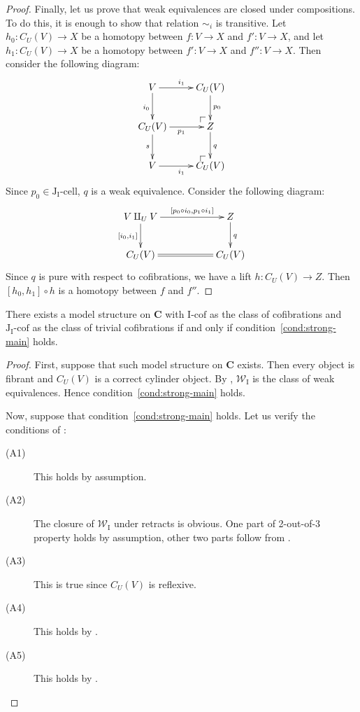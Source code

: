 \documentclass{tac}
\makeatletter
\theoremstyle{definition}
\newcommand{\we}{\mathcal{W}}
\newcommand{\cat}[1]{\mathbf{#1}}
\newcommand{\C}{\cat{C}}
\newcommand{\I}{\mathrm{I}}
\newcommand{\J}{\mathrm{J}}
\newcommand{\class}[2]{#1\text{-}\mathrm{#2}}
\newcommand{\Icell}[1][\I]{\class{#1}{cell}}
\newcommand{\Icof}[1][\I]{\class{#1}{cof}}
\newcommand{\Jcell}[1][]{\Icell[\J#1]}
\newcommand{\Jcof}[1][]{\Icof[\J#1]}
\newcommand{\cyli}{i}
\newcommand{\po}[1][dr]{\save*!/#1+1.2pc/#1:(1,-1)@^{|-}\restore}
\makeatother
\begin{document}
\begin{proof}
Finally, let us prove that weak equivalences are closed under compositions.
To do this, it is enough to show that relation $\sim_i$ is transitive.
Let $h_0 : C_U(V) \to X$ be a homotopy between $f : V \to X$ and $f' : V \to X$, and
let $h_1 : C_U(V) \to X$ be a homotopy between $f' : V \to X$ and $f'' : V \to X$.
Then consider the following diagram:
\[ \xymatrix{ V \ar[r]^{\cyli_1} \ar[d]_{\cyli_0} & C_U(V) \ar[d]^{p_0} \\
              C_U(V) \ar[r]_{p_1} \ar[d]_s & \po Z \ar[d]^q \\
              V \ar[r]_{\cyli_1} & \po C_U(V)
            } \]
Since $p_0 \in \Jcell[_\I]$, $q$ is a weak equivalence.
Consider the following diagram:
\[ \xymatrix{ V \amalg_U V \ar[rr]^-{[p_0 \circ \cyli_0, p_1 \circ \cyli_1]} \ar[d]_{[\cyli_0,\cyli_1]} & & Z \ar[d]^q \\
              C_U(V) \ar@{=}[rr] & & C_U(V)
            } \]
Since $q$ is pure with respect to cofibrations, we have a lift $h : C_U(V) \to Z$.
Then $[h_0,h_1] \circ h$ is a homotopy between $f$ and $f''$.
\end{proof}

\begin{thm}[main]
There exists a model structure on $\C$ with $\Icof$ as the class of cofibrations and $\Jcof[_\I]$ as the class of trivial cofibrations
if and only if condition~\eqref{cond:strong-main} holds.
\end{thm}
\begin{proof}
First, suppose that such model structure on $\C$ exists.
Then every object is fibrant and $C_U(V)$ is a correct cylinder object.
By , $\we_\I$ is the class of weak equivalences.
Hence condition~\eqref{cond:strong-main} holds.

Now, suppose that condition~\eqref{cond:strong-main} holds.
Let us verify the conditions of :
\begin{description}
\item[(A1)] This holds by assumption.
\item[(A2)] The closure of $\we_\I$ under retracts is obvious.
One part of 2-out-of-3 property holds by assumption, other two parts follow from .
\item[(A3)] This is true since $C_U(V)$ is reflexive.
\item[(A4)] This holds by .
\item[(A5)] This holds by .
\end{description}
\end{proof}
\end{document}
